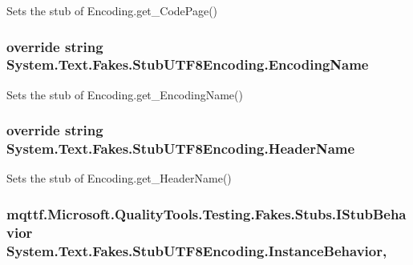 Sets the stub of Encoding.\-get\-\_\-\-Code\-Page()

\hypertarget{class_system_1_1_text_1_1_fakes_1_1_stub_u_t_f8_encoding_a35633bae526c50ab0227f1e7d4c2068d}{
\subsubsection[{Encoding\-Name}]{\setlength{\rightskip}{0pt plus 5cm}override string System.\-Text.\-Fakes.\-Stub\-U\-T\-F8\-Encoding.\-Encoding\-Name\hspace{0.3cm}{\ttfamily [get]}}}\label{class_system_1_1_text_1_1_fakes_1_1_stub_u_t_f8_encoding_a35633bae526c50ab0227f1e7d4c2068d}


Sets the stub of Encoding.\-get\-\_\-\-Encoding\-Name()

\hypertarget{class_system_1_1_text_1_1_fakes_1_1_stub_u_t_f8_encoding_afdb88d57918fdcb36ec2bf34220c1931}{
\subsubsection[{Header\-Name}]{\setlength{\rightskip}{0pt plus 5cm}override string System.\-Text.\-Fakes.\-Stub\-U\-T\-F8\-Encoding.\-Header\-Name\hspace{0.3cm}{\ttfamily [get]}}}\label{class_system_1_1_text_1_1_fakes_1_1_stub_u_t_f8_encoding_afdb88d57918fdcb36ec2bf34220c1931}


Sets the stub of Encoding.\-get\-\_\-\-Header\-Name()

\hypertarget{class_system_1_1_text_1_1_fakes_1_1_stub_u_t_f8_encoding_a7b968b08c404c313745e78df35157678}{
\subsubsection[{Instance\-Behavior}]{\setlength{\rightskip}{0pt plus 5cm}mqttf.\-Microsoft.\-Quality\-Tools.\-Testing.\-Fakes.\-Stubs.\-I\-Stub\-Behavior System.\-Text.\-Fakes.\-Stub\-U\-T\-F8\-Encoding.\-Instance\-Behavior\hspace{0.3cm}{\ttfamily [get]}, {\ttfamily [set]}}}\label{class_system_1_1_text_1_1_fakes_1_1_stub_u_t_f8_encoding_a7b968b08c404c313745e78df35157678}


